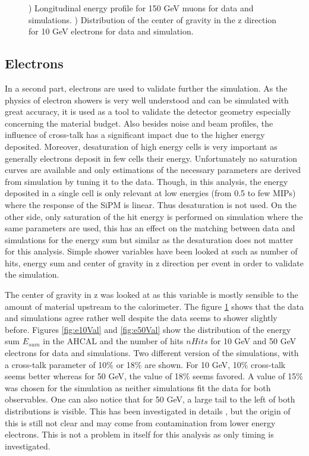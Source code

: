 \begin{figure}[htbp!]
\begin{subfigure}[t]{0.49\textwidth}
    \caption{} \label{fig:e10GoGZ}
  \end{subfigure}
  \caption{) Longitudinal energy profile for 150 GeV muons for data and simulations. ) Distribution of the center of gravity in the z direction for 10 GeV electrons for data and simulation.}
  \label{fig:Val}
\end{figure}

\subsection{Electrons}

In a second part, electrons are used to validate further the simulation. As the physics of electron showers is very well understood and can be simulated with great accuracy, it is used as a tool to validate the detector geometry especially concerning the material budget. Also besides noise and beam profiles, the influence of cross-talk has a significant impact due to the higher energy deposited. Moreover, desaturation of high energy cells is very important as generally electrons deposit in few cells their energy. Unfortunately no saturation curves are available and only estimations of the necessary parameters are derived from simulation by tuning it to the data. Though, in this analysis, the energy deposited in a single cell is only relevant at low energies (from 0.5 to few MIPs) where the response of the SiPM is linear. Thus desaturation is not used. On the other side, only saturation of the hit energy is performed on simulation where the same parameters are used, this has an effect on the matching between data and simulations for the energy sum but similar as the desaturation does not matter for this analysis. Simple shower variables have been looked at such as number of hits, energy sum and center of gravity in z direction per event in order to validate the simulation.

The center of gravity in z was looked at as this variable is mostly sensible to the amount of material upstream to the calorimeter. The figure \ref{fig:e10GoGZ} shows that the data and simulations agree rather well despite the data seems to shower slightly before. Figures \ref{fig:e10Val} and \ref{fig:e50Val} show the distribution of the energy sum $E_{sum}$ in the AHCAL and the number of hits $nHits$ for 10 GeV and 50 GeV electrons for data and simulations. Two different version of the simulations, with a cross-talk parameter of 10\% or 18\% are shown. For 10 GeV, 10\% cross-talk seems better whereas for 50 GeV, the value of 18\% seems favored. A value of 15\% was chosen for the simulation as neither simulations fit the data for both observables. One can also notice that for 50 GeV, a large tail to the left of both distributions is visible. This has been investigated in details \cite{AmbraEnergy}, but the origin of this is still not clear and may come from contamination from lower energy electrons. This is not a problem in itself for this analysis as only timing is investigated.

